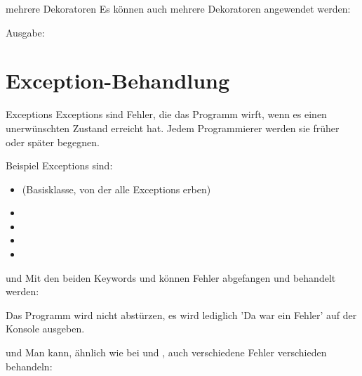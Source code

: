 \begin{frame}{mehrere Dekoratoren}
	Es können auch mehrere Dekoratoren angewendet werden:
	
	Ausgabe: \linebreak
	 \linebreak
	 \linebreak
	 \linebreak
	 \linebreak
\end{frame}

\section{Exception-Behandlung}
\begin{frame}{Exceptions}
	\alert{Exceptions} sind Fehler, die das Programm wirft, wenn es einen unerwünschten Zustand erreicht hat. Jedem Programmierer werden sie früher oder später begegnen.
	
	Beispiel Exceptions sind:
	\begin{itemize}
		\item {}(Basisklasse, von der alle Exceptions erben)
		\item {}
		\item {}
		\item {}
		\item {}
	\end{itemize}
\end{frame}

\begin{frame}{ und }
	Mit den beiden Keywords  und  können Fehler abgefangen und behandelt werden:
	
	Das Programm wird nicht abstürzen, es wird lediglich 'Da war ein Fehler' auf der Konsole ausgeben.
\end{frame}

\begin{frame}{ und }
	Man kann, ähnlich wie bei  und , auch verschiedene Fehler verschieden behandeln:
	
\end{frame}


